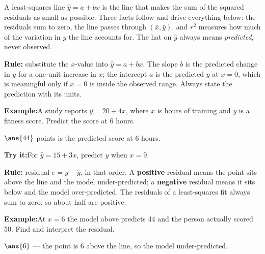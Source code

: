 \documentclass[12pt]{article}
\begin{document}

\noindent\small A least-squares line $\hat{y} = a + bx$ is the line that makes
the sum of the squared residuals as small as possible. Three facts follow and
drive everything below: the residuals sum to zero, the line passes through
$(\bar{x}, \bar{y})$, and $r^2$ measures how much of the variation in $y$ the
line accounts for. The hat on $\hat{y}$ always means \emph{predicted}, never
observed.\normalsize


\begin{formulabox}
\textbf{Rule:} substitute the $x$-value into $\hat{y} = a + bx$. The slope $b$
is the predicted change in $y$ for a one-unit increase in $x$; the intercept $a$
is the predicted $y$ at $x = 0$, which is meaningful only if $x = 0$ is inside
the observed range. Always state the prediction with its units.
\end{formulabox}

\begin{examplebox}
\textbf{Example:}\quad A study reports $\hat{y} = 20 + 4x$, where $x$ is hours
of training and $y$ is a fitness score. Predict the score at 6 hours.

$\ans{44}$ points is the predicted score at 6 hours.
\end{examplebox}

\begin{tryitbox}
\textbf{Try it:}\quad For $\hat{y} = 15 + 3x$, predict $y$ when $x = 9$.\\[2pt]
\end{tryitbox}


\begin{formulabox}
\textbf{Rule:} residual $e = y - \hat{y}$, in that order. A \textbf{positive}
residual means the point sits above the line and the model under-predicted; a
\textbf{negative} residual means it sits below and the model over-predicted. The
residuals of a least-squares fit always sum to zero, so about half are positive.
\end{formulabox}

\begin{examplebox}
\textbf{Example:}\quad At $x = 6$ the model above predicts 44 and the person
actually scored 50. Find and interpret the residual.

$\ans{6}$ --- the point is 6 above the line, so the model under-predicted.
\end{examplebox}
\end{document}
